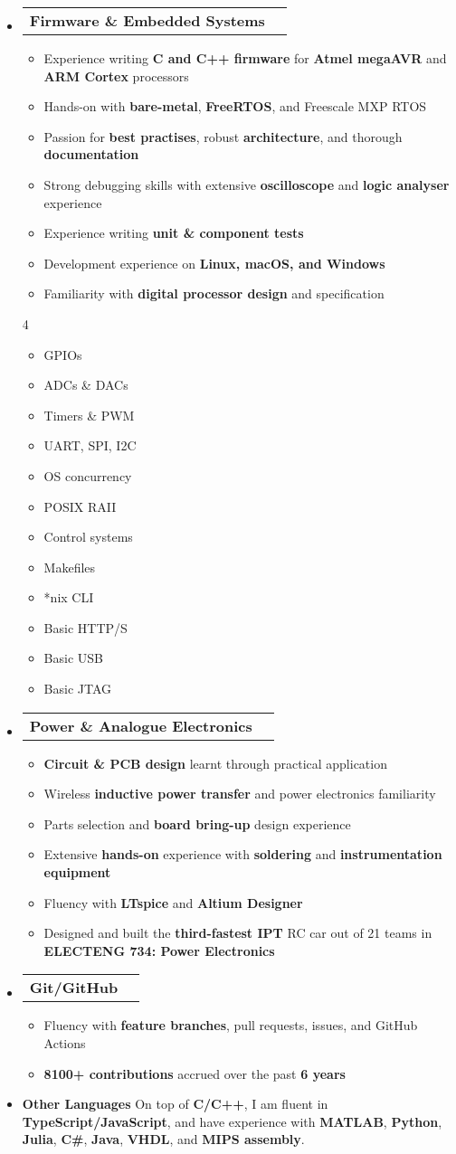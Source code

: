\documentclass[11pt,a4paper]{article}[leftmargin=*]
\makeatletter
\def \entryspacing {-0pt}
\def \bulletstylei {\faAngleRight\hspace{-4.5pt}}
\newcommand{\resumeEntryStart}{\begin{itemize}[leftmargin=2.5mm]}
\newcommand{\resumeEntryEnd}{\end{itemize}\vspace{\entryspacing}}
\newcommand{\resumeItemListStart}{\begin{itemize}[leftmargin=4.5mm]}
\newcommand{\resumeItemListEnd}{\end{itemize}}
\newcommand{\resumeItemListStartColumns}[2][-0.5]{\vspace*{#1\multicolsep}
\begin{multicols}{#2}\begin{itemize}[leftmargin=4.5mm]}
\newcommand{\resumeItemListEndColumns}[1][-1]{\end{itemize}\end{multicols}\vspace*{#1\multicolsep}}
\newcommand{\resumeItem}[2][\bulletstylei]{
  \item[\small#1]\small{
    {#2 \vspace{-2pt}}
  }
}
\newcommand{\resumeEntryTD}[2]{
  \vspace{-1pt}\item[]
    \begin{tabularx}{0.97\textwidth}{X@{\hspace{60pt}}r}
      \textbf{\color{primary}#1} & {\firabook\color{accent}\small#2} \\
    \end{tabularx}\vspace{-6pt}
}
\newcommand{\resumeEntryS}[2]{
  \item[]\small{
    \textbf{\color{primary}#1 }{ #2 \vspace{-4pt}}
  }
}
\newcommand{\resumeBf}[1]{\small\textbf{\color{halfbold}#1}}
\makeatother
\begin{document}
\resumeEntryStart
\resumeEntryTD
{Firmware \& Embedded Systems}{}
\resumeItemListStart
\resumeItem {Experience writing \resumeBf{C and C++ firmware} for \resumeBf{Atmel megaAVR} and \resumeBf{ARM Cortex} processors}
\resumeItem {Hands-on with \resumeBf{bare-metal}, \resumeBf{FreeRTOS}, and Freescale MXP RTOS}
\resumeItem {Passion for \resumeBf{best practises}, robust \resumeBf{architecture}, and thorough \resumeBf{documentation}}
\resumeItem {Strong debugging skills with extensive \resumeBf{oscilloscope} and \resumeBf{logic analyser} experience}
\resumeItem {Experience writing \resumeBf{unit \& component tests}}
\resumeItem {Development experience on \resumeBf{Linux, macOS, and Windows}}
\resumeItem {Familiarity with \resumeBf{digital processor design} and specification}
\resumeItemListEnd
\resumeItemListStartColumns[-0.5]{4}
\resumeItem {GPIOs}
\resumeItem {ADCs \& DACs}
\resumeItem {Timers \& PWM}
\resumeItem {UART, SPI, I2C}
\resumeItem {OS concurrency}
\resumeItem {POSIX RAII}
\resumeItem {Control systems}
\resumeItem {Makefiles}
\resumeItem {*nix CLI}
\resumeItem {Basic HTTP/S}
\resumeItem {Basic USB}
\resumeItem {Basic JTAG}
\resumeItemListEndColumns
\resumeEntryEnd

\resumeEntryStart
\resumeEntryTD
{Power \& Analogue Electronics}{}
\resumeItemListStart
\resumeItem {\resumeBf{Circuit \& PCB design} learnt through practical application}
\resumeItem {Wireless \resumeBf{inductive power transfer} and power electronics familiarity}
\resumeItem {Parts selection and \resumeBf{board bring-up} design experience}
\resumeItem {Extensive \resumeBf{hands-on} experience with \resumeBf{soldering} and \resumeBf{instrumentation equipment}}
\resumeItem {Fluency with \resumeBf{LTspice} and \resumeBf{Altium Designer}}
\resumeItem {Designed and built the \resumeBf{third-fastest IPT} RC car out of 21 teams in \resumeBf{ELECTENG 734: Power Electronics}}
\resumeItemListEnd
\resumeEntryEnd

\resumeEntryStart
\resumeEntryTD
{Git/GitHub}{}
\resumeItemListStart
\resumeItem {Fluency with \resumeBf{feature branches}, pull requests, issues, and GitHub Actions}
\resumeItem {\resumeBf{8100+ contributions} accrued over the past \resumeBf{6 years}}
\resumeItemListEnd
\resumeEntryEnd

\resumeEntryStart
\resumeEntryS
{Other Languages}{On top of \resumeBf{C/C++}, I am fluent in \resumeBf{TypeScript/JavaScript}, and have experience with \resumeBf{MATLAB}, \resumeBf{Python}, \resumeBf{Julia}, \resumeBf{C\#}, \resumeBf{Java}, \resumeBf{VHDL}, and \resumeBf{MIPS assembly}.}
\resumeEntryEnd
\end{document}
